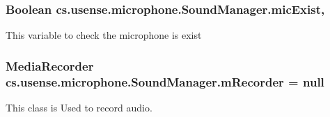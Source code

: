 \subsubsection[{mic\+Exist}]{\setlength{\rightskip}{0pt plus 5cm}Boolean cs.\+usense.\+microphone.\+Sound\+Manager.\+mic\+Exist\hspace{0.3cm}{\ttfamily [static]}, {\ttfamily [private]}}\label{classcs_1_1usense_1_1microphone_1_1_sound_manager_ae449a315ff7fb69c5b46ed55145d4e35}
This variable to check the microphone is exist \hypertarget{classcs_1_1usense_1_1microphone_1_1_sound_manager_a9ef598c38a43c11b72944957704b07e4}{}
\subsubsection[{m\+Recorder}]{\setlength{\rightskip}{0pt plus 5cm}Media\+Recorder cs.\+usense.\+microphone.\+Sound\+Manager.\+m\+Recorder = null\hspace{0.3cm}{\ttfamily [private]}}\label{classcs_1_1usense_1_1microphone_1_1_sound_manager_a9ef598c38a43c11b72944957704b07e4}
This class is Used to record audio. \hypertarget{classcs_1_1usense_1_1microphone_1_1_sound_manager_a654ce160547e8ea92271b68ebb11a6b2}{}
